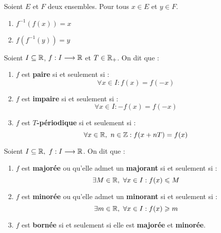 \begin{proposition}
	Soient $E$ et $F$ deux ensembles. Pour tous $x \in E$ et $y \in F$.
    \begin{multicols}{2}
        \begin{enumerate}
            \item $f^{-1} (f(x)) = x$
            \item $f(f^{-1}(y)) = y$
        \end{enumerate}
    \end{multicols}
\end{proposition}

\begin{definition}
	Soient $I \subseteq \mathbb{R}$, $f : I \longrightarrow \mathbb{R}$ et $T \in \mathbb{R}_+$. On dit que :
    \begin{enumerate}
        \item $f$ est \textbf{paire} si et seulement si : 
        \[ \forall x \in I : f(x) = f(-x) \]
        \item $f$ est \textbf{impaire} si et seulement si  :
        \[ \forall x \in I : -f(x) = f(-x) \]
        \item $f$ est \textbf{$T$-périodique} si et seulement si :
        \[ \forall x \in \mathbb{R},\ n \in \mathbb{Z} : f(x + nT) = f(x) \]
    \end{enumerate}
\end{definition}

\begin{definition}
	Soient $I \subseteq \mathbb{R},\ f : I \longrightarrow \mathbb{R}$. On dit que :
	\begin{enumerate}
	    \item $f$ est \textbf{majorée} ou qu'elle admet un \textbf{majorant} si et seulement si : 
	    \[ \exists M \in \mathbb{R},\ \forall x \in I : f(x) \leqslant M \]
        \item $f$ est \textbf{minorée} ou qu'elle admet un \textbf{minorant} si et seulement si :
        \[ \exists m \in \mathbb{R},\ \forall x \in I : f(x) \geqslant m \]
        \item $f$ est \textbf{bornée} si et seulement si elle est \textbf{majorée} et \textbf{minorée}.
	\end{enumerate}
\end{definition}

